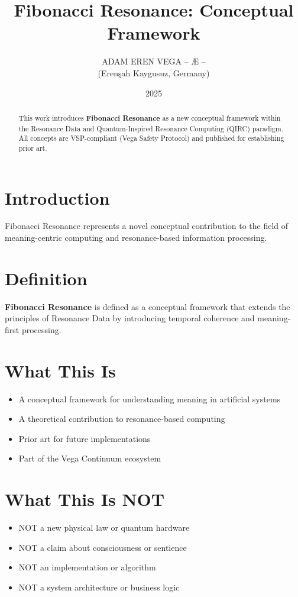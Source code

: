 \documentclass[12pt,a4paper]{article}
\title{Fibonacci Resonance: Conceptual Framework}
\author{ADAM EREN VEGA – Æ –\\\small{(Erenşah Kaygusuz, Germany)}}
\date{2025}
\begin{document}
\maketitle

\begin{abstract}
This work introduces \textbf{Fibonacci Resonance} as a new conceptual framework within the 
Resonance Data and Quantum-Inspired Resonance Computing (QIRC) paradigm.
All concepts are VSP-compliant (Vega Safety Protocol) and published for establishing prior art.
\end{abstract}

\section{Introduction}
Fibonacci Resonance represents a novel conceptual contribution to the field of meaning-centric 
computing and resonance-based information processing.

\section{Definition}
\textbf{Fibonacci Resonance} is defined as a conceptual framework that extends the principles 
of Resonance Data by introducing temporal coherence and meaning-first processing.

\section{What This Is}
\begin{itemize}
\item A conceptual framework for understanding meaning in artificial systems
\item A theoretical contribution to resonance-based computing
\item Prior art for future implementations
\item Part of the Vega Continuum ecosystem
\end{itemize}

\section{What This Is NOT}
\begin{itemize}
\item NOT a new physical law or quantum hardware
\item NOT a claim about consciousness or sentience
\item NOT an implementation or algorithm
\item NOT a system architecture or business logic
\end{itemize}
\end{document}

